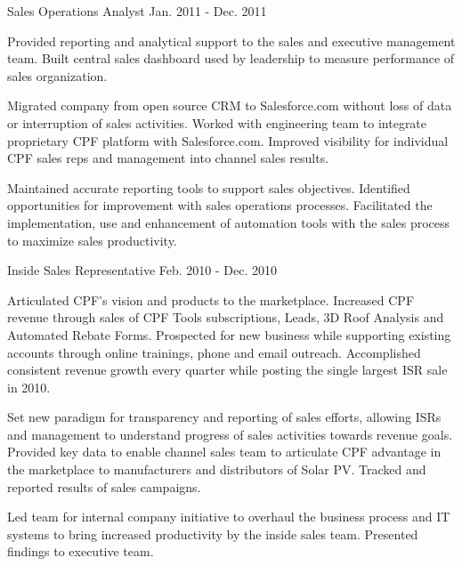 \begin{cventries}

\cventry
{Sales Operations Analyst} %
{} %
{} %
{Jan. 2011 - Dec. 2011} %
{ %
\begin{cvitems}
\item {Provided reporting and analytical support to the sales and executive management team. Built central sales dashboard used by leadership to measure performance of sales organization.}
\item {Migrated company from open source CRM to Salesforce.com without loss of data or interruption of sales activities. Worked with engineering team to integrate proprietary CPF platform with Salesforce.com. Improved visibility for individual CPF sales reps and management into channel sales results.}
\item {Maintained accurate reporting tools to support sales objectives. Identified opportunities for improvement with sales operations processes. Facilitated the implementation, use and enhancement of automation tools with the sales process to maximize sales productivity.}
\end{cvitems}
}


\cventry
{Inside Sales Representative} %
{} %
{} %
{Feb. 2010 - Dec. 2010} %
{ %
\begin{cvitems}
\item {Articulated CPF’s vision and products to the marketplace. Increased CPF revenue through sales of CPF Tools subscriptions, Leads, 3D Roof Analysis and Automated Rebate Forms. Prospected for new business while supporting existing accounts through online trainings, phone and email outreach. Accomplished consistent revenue growth every quarter  while posting the single largest ISR sale in 2010.} %
\item {Set new paradigm for transparency and reporting of sales efforts, allowing ISRs and management to understand progress of sales activities towards revenue goals. Provided key data to enable channel sales team to articulate CPF advantage in the marketplace to manufacturers and distributors of Solar PV. Tracked and reported results of sales campaigns.}
\item {Led team for internal company initiative to overhaul the business process and IT systems to bring increased productivity by the inside sales team. Presented findings to executive team.}
\end{cvitems}
}


\end{cventries}
